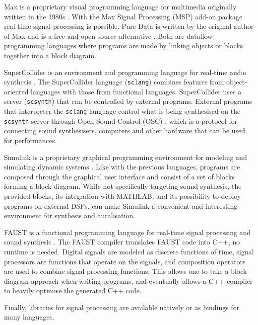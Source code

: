 Max is a proprietary visual programming language for multimedia originally
written in the 1980s \cite{Max2017}. With the Max Signal Processing (MSP) add-on
package real-time signal processing is possible. Pure Data is written by the
original author of Max and is a free and open-source alternative
\cite{PureData2017}. Both are dataflow programming languages where programs are
made by linking objects or blocks together into a block diagram.

SuperCollider is an environment and programming language for real-time audio
synthesis \cite{SuperCollider2017} . The SuperCollider language
(\texttt{sclang}) combines features from object-oriented languages with
those from functional languages. SuperCollider uses a server
(\texttt{scsynth}) that can be controlled by external programs. External
programs that interpreter the \texttt{sclang} language control what is
being synthesised on the \texttt{scsynth} server through Open Sound
Control (OSC) , which is a protocol for connecting sound synthesisers, computers
and other hardware that can be used for performances.

Simulink is a proprietary graphical programming environment for modeling and
simulating dynamic systems \cite{Simulink2017}. Like with the previous
languages, programs are composed through the graphical user interface and
consist of a set of blocks forming a block diagram. While not specifically
targeting sound synthesis, the provided blocks, its integration with MATHLAB,
and its possibility to deploy programs on external DSPs, can make Simulink a
convenient and interesting environment for synthesis and auralisation.


FAUST is a functional programming language for real-time signal processing and
sound synthesis \cite{Faust2017}. The FAUST compiler translates FAUST code into
C++, no runtime is needed. Digital signals are modeled as discrete functions of
time, signal processors are functions that operate on the signals, and
composition operators are used to combine signal processing functions.
This allows one to take a block diagram approach when writing programs, and
eventually allows a C++ compiler to heavily optimise the generated C++ code.

Finally, libraries for signal processing are available natively or as bindings
for many languages.




